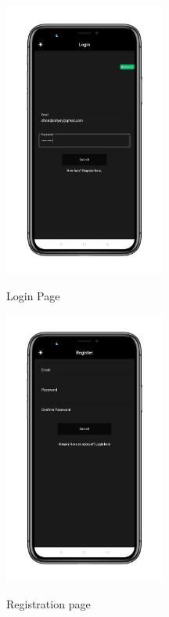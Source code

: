 \begin{figure}
\centering
\begin{minipage}{.5\textwidth}
  \centering
   \includegraphics[height=90mm]{Images & Logos/theme/CH_08_Dark_1.png}
  \caption{Login Page}
\end{minipage}%
\begin{minipage}{.5\textwidth}
  \centering
   \includegraphics[height=90mm]{Images & Logos/theme/CH_08_Dark_2.png}\\
  \caption{Registration page}
\end{minipage}


\end{figure}

